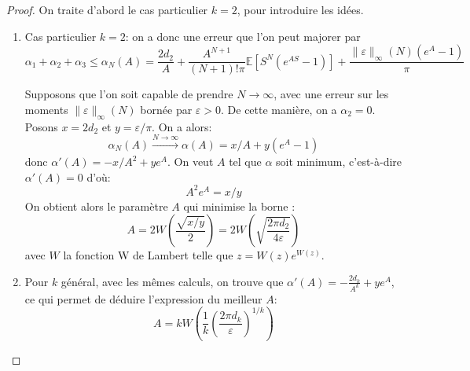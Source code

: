 \documentclass[12pt]{article}
\newcommand{\pth}[1]{\left(#1\right)}
\newcommand{\cro}[1]{\left[#1\right]}
\newcommand{\dabs}[1]{\|#1\|}
\newcommand{\Esp}[1]{\mathbb{E}\cro{#1}}
\begin{document}
\begin{proof} On traite d'abord le cas particulier $k=2$, pour introduire les idées.
\begin{enumerate}
\item Cas particulier $k=2$: on a donc une erreur que l'on peut majorer par
\[\alpha_1+\alpha_2+\alpha_3 \leqslant \alpha_N(A)=\frac{2d_2}{A}+\frac{A^{N+1}}{(N+1)!\pi}\Esp{S^N(e^{AS}-1)}+\frac{\dabs{\varepsilon}_{\infty}(N)(e^A-1)}{\pi}\]

Supposons que l'on soit capable de prendre $N\to\infty$, avec une erreur sur les moments $\dabs{\varepsilon}_{\infty}(N)$ bornée par $\varepsilon>0$. De cette manière, on a $\alpha_2=0$. Posons $x=2d_2$ et $y=\varepsilon/\pi$. On a alors:
\[\alpha_N(A)\xrightarrow{N\to\infty}\alpha(A)=x/A+y(e^A-1)\]
donc $\alpha'(A)=-x/A^2+ye^A$. On veut $A$ tel que $\alpha$ soit minimum, c'est-à-dire $\alpha'(A)=0$ d'où:
\[A^2e^A=x/y\]
On obtient alors le paramètre $A$ qui minimise la borne : 
\[A = 2W\pth{\frac{\sqrt{x/y}}2} = 2W\pth{\sqrt{\frac{2\pi d_2}{4 \varepsilon}}}\]
avec $W$ la fonction W de Lambert telle que $z=W(z)e^{W(z)}$.

\item Pour $k$ général, avec les mêmes calculs, on trouve que $\alpha'(A)=-\frac{2d_k}{A^k}+ye^A$, ce qui permet de déduire l'expression du meilleur $A$:
\[A=kW\pth{\frac{1}{k}\pth{\frac{2\pi d_k}{\varepsilon}}^{1/k}}\]


\end{enumerate}
\end{proof}
\end{document}
